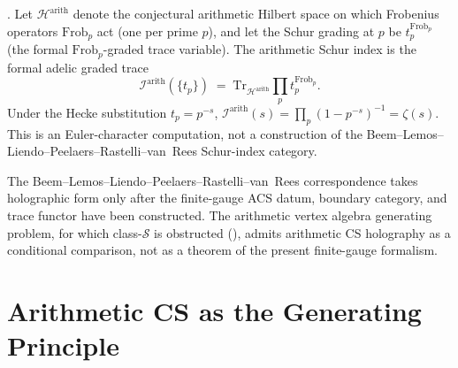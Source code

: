 \begin{theorem}
\label{v4-arith:thm:arithmetic-schur-index}
\ClaimStatusConjectured. Let \(\mathcal{H}^{\mathrm{arith}}\) denote
the conjectural arithmetic Hilbert space on which Frobenius operators
\(\mathrm{Frob}_{p}\) act (one per prime \(p\)), and let the Schur
grading at \(p\) be \(t_{p}^{\mathrm{Frob}_{p}}\) (the formal
\(\mathrm{Frob}_{p}\)-graded trace variable). The arithmetic Schur
index is the formal adelic graded trace
\begin{equation}
\mathcal{I}^{\mathrm{arith}}(\{t_{p}\})\;=\;\mathrm{Tr}_{\mathcal{H}^{\mathrm{arith}}}\prod_{p}t_{p}^{\mathrm{Frob}_{p}}.
\end{equation}
Under the Hecke substitution \(t_{p}=p^{-s}\),
\(\mathcal{I}^{\mathrm{arith}}(s)=\prod_{p}(1-p^{-s})^{-1}=\zeta(s)\).
This is an Euler-character computation, not a construction of the
Beem--Lemos--Liendo--Peelaers--Rastelli--van~Rees Schur-index
category.
\end{theorem}

\begin{remark}
The Beem--Lemos--Liendo--Peelaers--Rastelli--van~Rees correspondence
takes holographic form only after the finite-gauge ACS datum, boundary
category, and trace functor have been constructed. The arithmetic
vertex algebra generating problem, for which class-\(\mathcal{S}\) is obstructed
(), admits arithmetic CS
holography as a conditional comparison, not as a theorem of the
present finite-gauge formalism.
\end{remark}

\section{Arithmetic CS as the Generating Principle}
\label{v4-arith:ga:summary}

